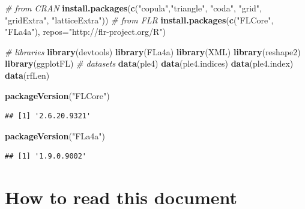 \documentclass[
]{book}
\newenvironment{Shaded}{\begin{snugshade}}{\end{snugshade}}
\newcommand{\AttributeTok}[1]{\textcolor[rgb]{0.13,0.29,0.53}{#1}}
\newcommand{\CommentTok}[1]{\textcolor[rgb]{0.56,0.35,0.01}{\textit{#1}}}
\newcommand{\FunctionTok}[1]{\textcolor[rgb]{0.13,0.29,0.53}{\textbf{#1}}}
\newcommand{\NormalTok}[1]{#1}
\newcommand{\StringTok}[1]{\textcolor[rgb]{0.31,0.60,0.02}{#1}}
\begin{document}
\begin{Shaded}
\begin{Highlighting}[]
\CommentTok{\# from CRAN}
\FunctionTok{install.packages}\NormalTok{(}\FunctionTok{c}\NormalTok{(}\StringTok{"copula"}\NormalTok{,}\StringTok{"triangle"}\NormalTok{, }\StringTok{"coda"}\NormalTok{, }\StringTok{"grid"}\NormalTok{, }\StringTok{"gridExtra"}\NormalTok{, }\StringTok{"latticeExtra"}\NormalTok{))}
\CommentTok{\# from FLR}
\FunctionTok{install.packages}\NormalTok{(}\FunctionTok{c}\NormalTok{(}\StringTok{"FLCore"}\NormalTok{, }\StringTok{"FLa4a"}\NormalTok{), }\AttributeTok{repos=}\StringTok{"http://flr{-}project.org/R"}\NormalTok{)}
\end{Highlighting}
\end{Shaded}

\begin{Shaded}
\begin{Highlighting}[]
\CommentTok{\# libraries}
\FunctionTok{library}\NormalTok{(devtools)}
\FunctionTok{library}\NormalTok{(FLa4a)}
\FunctionTok{library}\NormalTok{(XML)}
\FunctionTok{library}\NormalTok{(reshape2)}
\FunctionTok{library}\NormalTok{(ggplotFL)}
\CommentTok{\# datasets}
\FunctionTok{data}\NormalTok{(ple4)}
\FunctionTok{data}\NormalTok{(ple4.indices)}
\FunctionTok{data}\NormalTok{(ple4.index)}
\FunctionTok{data}\NormalTok{(rfLen)}
\end{Highlighting}
\end{Shaded}

\begin{Shaded}
\begin{Highlighting}[]
\FunctionTok{packageVersion}\NormalTok{(}\StringTok{"FLCore"}\NormalTok{)}
\end{Highlighting}
\end{Shaded}

\begin{verbatim}
## [1] '2.6.20.9321'
\end{verbatim}

\begin{Shaded}
\begin{Highlighting}[]
\FunctionTok{packageVersion}\NormalTok{(}\StringTok{"FLa4a"}\NormalTok{)}
\end{Highlighting}
\end{Shaded}

\begin{verbatim}
## [1] '1.9.0.9002'
\end{verbatim}

\hypertarget{how-to-read-this-document}{%
\section{How to read this document}\label{how-to-read-this-document}}
\end{document}
